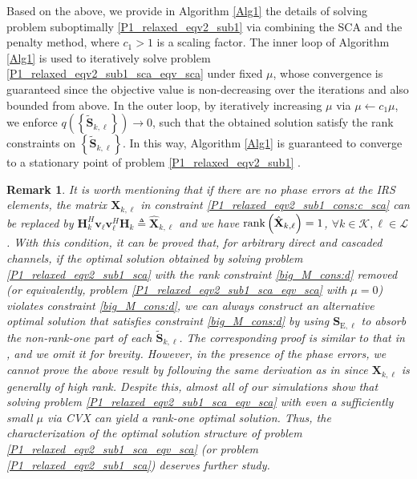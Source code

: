 \documentclass[12pt,draftclsnofoot, onecolumn]{IEEEtran}
\theoremstyle{plain}
\newtheorem{rem}{Remark}
\begin{document}
\begin{sloppypar}
Based on the above, we provide in Algorithm \ref{Alg1} the details of solving problem suboptimally \eqref{P1_relaxed_eqv2_sub1} via combining the SCA and the penalty method, where $c_1 > 1$ is a scaling factor. The inner loop of Algorithm \ref{Alg1} is used to iteratively solve problem \eqref{P1_relaxed_eqv2_sub1_sca_eqv_sca} under fixed $\mu$, whose convergence is guaranteed since the objective value is non-decreasing over the iterations and also bounded from above. In the outer loop, by iteratively increasing $\mu$ via $\mu\leftarrow c_1\mu$, we enforce $q\left(\left\lbrace\tilde{\mathbf S}_{k,\ell}\right\rbrace\right) \rightarrow 0$, such that the obtained solution satisfy the rank constraints on $\left\lbrace\tilde{\mathbf S}_{k,\ell}\right\rbrace$. In this way, Algorithm \ref{Alg1} is guaranteed to converge to a stationary point of problem \eqref{P1_relaxed_eqv2_sub1} \cite{2016_Sun_stationary}. 
\vspace{-3mm}
\begin{rem}\label{rem1}
	It is worth mentioning that if there are no phase errors at the IRS elements, the matrix $\mathbf X_{k,\ell}$ in constraint \eqref{P1_relaxed_eqv2_sub1_cons:c_sca} can be replaced by $\mathbf H_k^H\mathbf v_\ell\mathbf v_\ell^H\mathbf H_k \triangleq \hat{\mathbf X}_{k,\ell}$ and we have ${\rm rank}\left(\hat{\mathbf X}_{k,\ell}\right) = 1$, $\forall k\in\mathcal K, \ell\in\mathcal L$. With this condition, it can be proved that, for arbitrary direct and cascaded channels, if the optimal solution obtained by solving problem \eqref{P1_relaxed_eqv2_sub1_sca} with the rank constraint \eqref{big_M_cons:d} removed (or equivalently, problem  \eqref{P1_relaxed_eqv2_sub1_sca_eqv_sca} with $\mu = 0$) violates constraint \eqref{big_M_cons:d}, we can always construct an alternative optimal solution that satisfies constraint \eqref{big_M_cons:d} by using $\mathbf S_{\mathrm E, \ell}$ to absorb the non-rank-one part of each $\tilde{\mathbf S}_{k,\ell}$. The corresponding proof is similar to that in \cite[Appendix B]{2020_Xianghao_secure_rank1}, and we omit it for brevity. However, in the presence of the phase errors, we cannot prove the above result by following the same derivation as in \cite[Appendix B]{2020_Xianghao_secure_rank1} since $\mathbf X_{k,\ell}$ is generally of high rank. Despite this, almost all of our simulations show that solving problem \eqref{P1_relaxed_eqv2_sub1_sca_eqv_sca} with even a sufficiently small $\mu$ via CVX can yield a rank-one optimal solution. Thus, the characterization of the optimal solution structure of problem \eqref{P1_relaxed_eqv2_sub1_sca_eqv_sca} (or problem \eqref{P1_relaxed_eqv2_sub1_sca})  deserves further study. 
\end{rem}
\vspace{-3mm}    


\end{sloppypar}
\end{document}
